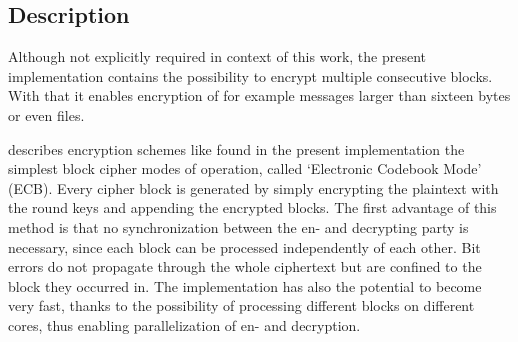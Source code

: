 \hypertarget{description-7}{%
\subsection{Description}\label{description-7}}

Although not explicitly required in context of this work, the present
implementation contains the possibility to encrypt multiple consecutive
blocks. With that it enables encryption of for example messages larger
than sixteen bytes or even files.

\cite[ch. 5.1.1]{paar} describes
encryption schemes like found in the present implementation the simplest
block cipher modes of operation, called `Electronic Codebook Mode' (ECB).
Every cipher block is generated by simply encrypting the plaintext with
the round keys and appending the encrypted blocks. The first advantage
of this method is that no synchronization between the en- and decrypting
party is necessary, since each block can be processed independently of
each other. Bit errors do not propagate through the whole ciphertext but
are confined to the block they occurred in. The implementation has also
the potential to become very fast, thanks to the possibility of
processing different blocks on different cores, thus enabling
parallelization of en- and decryption.

